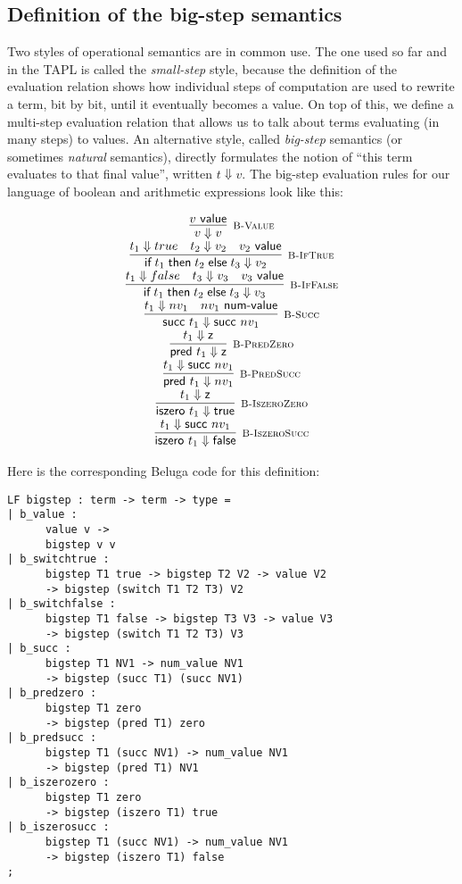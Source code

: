 \subsection{Definition of the big-step semantics}

Two styles of operational semantics are in common use. The one used so far and
in the TAPL is called the {\em small-step} style, because the definition of the
evaluation relation shows how individual steps of computation are used to
rewrite a term, bit by bit, until it eventually becomes a value. On top of this,
we define a multi-step evaluation relation that allows us to talk about terms
evaluating (in many steps) to values. An alternative style, called
{\em big-step} semantics (or sometimes {\em natural} semantics), directly
formulates the notion of ``this term evaluates to that final value'', written
$t \Downarrow v$. The big-step evaluation rules for our language of boolean and
arithmetic expressions look like this:

\[
\begin{array}{c}
  \infer[\BValue]{v \Downarrow v}{v \Value} \\
  \infer[\BIfTrue]{\tmif {t_1}{t_2}{t_3} \Downarrow v_2}{t_1 \Downarrow true & t_2 \Downarrow v_2 & v_2 \Value} \\
  \infer[\BIfFalse]{\tmif {t_1}{t_2}{t_3} \Downarrow v_3}{t_1 \Downarrow false & t_3 \Downarrow v_3 & v_3 \Value} \\
  \infer[\BSucc]{\tmsucc t_1 \Downarrow \tmsucc nv_1}{t_1 \Downarrow nv_1 & nv_1 \NumValue} \\
  \infer[\BPredZero]{\tmpred t_1 \Downarrow \tmzero}{t_1 \Downarrow \tmzero} \\
  \infer[\BPredSucc]{\tmpred t_1 \Downarrow nv_1}{t_1 \Downarrow \tmsucc nv_1} \\
  \infer[\BIszeroZero]{\tmiszero t_1 \Downarrow \tmtrue}{t_1 \Downarrow \tmzero} \\
  \infer[\BIszeroSucc]{\tmiszero t_1 \Downarrow \tmfalse}{t_1 \Downarrow \tmsucc nv_1} \\
\end{array}
\]

Here is the corresponding Beluga code for this definition:

\begin{lstlisting}
LF bigstep : term -> term -> type =
| b_value :
      value v ->
      bigstep v v
| b_switchtrue :
      bigstep T1 true -> bigstep T2 V2 -> value V2
      -> bigstep (switch T1 T2 T3) V2
| b_switchfalse :
      bigstep T1 false -> bigstep T3 V3 -> value V3
      -> bigstep (switch T1 T2 T3) V3
| b_succ :
      bigstep T1 NV1 -> num_value NV1
      -> bigstep (succ T1) (succ NV1)
| b_predzero :
      bigstep T1 zero
      -> bigstep (pred T1) zero
| b_predsucc :
      bigstep T1 (succ NV1) -> num_value NV1
      -> bigstep (pred T1) NV1
| b_iszerozero :
      bigstep T1 zero
      -> bigstep (iszero T1) true
| b_iszerosucc :
      bigstep T1 (succ NV1) -> num_value NV1
      -> bigstep (iszero T1) false
;
\end{lstlisting}

